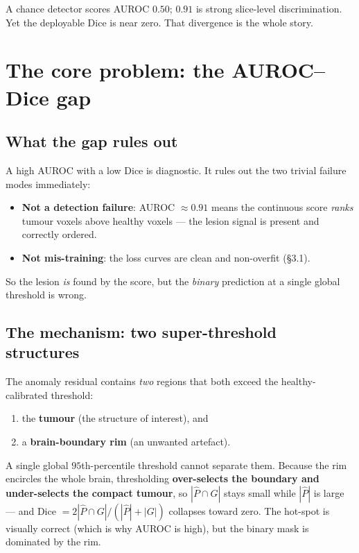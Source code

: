 \documentclass[11pt,a4paper]{article}
\begin{document}
\noindent
A chance detector scores AUROC $0.50$; $0.91$ is strong slice-level
discrimination. Yet the deployable Dice is near zero. That divergence is the
whole story.

\section{The core problem: the AUROC--Dice gap}

\subsection{What the gap rules out}
A high AUROC with a low Dice is diagnostic. It rules out the two trivial failure
modes immediately:
\begin{itemize}[leftmargin=1.4em,itemsep=0pt]
\item \textbf{Not a detection failure}: AUROC $\approx0.91$ means the continuous
score \emph{ranks} tumour voxels above healthy voxels --- the lesion signal is
present and correctly ordered.
\item \textbf{Not mis-training}: the loss curves are clean and non-overfit
(\S3.1).
\end{itemize}
So the lesion \emph{is} found by the score, but the \emph{binary} prediction at a
single global threshold is wrong.

\subsection{The mechanism: two super-threshold structures}
The anomaly residual contains \emph{two} regions that both exceed the
healthy-calibrated threshold:
\begin{enumerate}[leftmargin=1.5em,itemsep=0pt]
\item the \textbf{tumour} (the structure of interest), and
\item a \textbf{brain-boundary rim} (an unwanted artefact).
\end{enumerate}
A single global $95$th-percentile threshold cannot separate them. Because the rim
encircles the whole brain, thresholding \textbf{over-selects the boundary and
under-selects the compact tumour}, so $|\hat P\cap G|$ stays small while
$|\hat P|$ is large --- and Dice $=2|\hat P\cap G|/(|\hat P|+|G|)$ collapses
toward zero. The hot-spot is visually correct (which is why AUROC is high), but
the binary mask is dominated by the rim.
\end{document}
